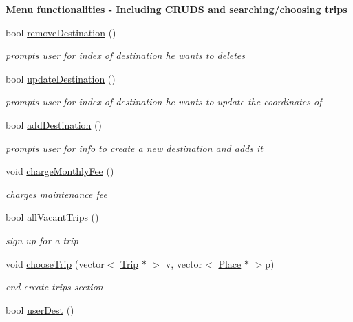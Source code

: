 \begin{Indent}{\bf Menu functionalities -\/ Including C\+R\+U\+D\+S and searching/choosing trips}\par
\begin{DoxyCompactItemize}
\item 
bool \hyperlink{class_lyfter_a229f84ba040c5f42d9e00d1f50fbb079}{remove\+Destination} ()
\begin{DoxyCompactList}\small\item\em prompts user for index of destination he wants to deletes \end{DoxyCompactList}\item 
bool \hyperlink{class_lyfter_a3e284ab6e91636535556871e32e64b39}{update\+Destination} ()
\begin{DoxyCompactList}\small\item\em prompts user for index of destination he wants to update the coordinates of \end{DoxyCompactList}\item 
bool \hyperlink{class_lyfter_a1824e5cd2a1fd794e9686f436bb71aca}{add\+Destination} ()
\begin{DoxyCompactList}\small\item\em prompts user for info to create a new destination and adds it \end{DoxyCompactList}\item 
void \hyperlink{class_lyfter_adbcaa02b69b1649d845f93c7915a21c4}{charge\+Monthly\+Fee} ()
\begin{DoxyCompactList}\small\item\em charges maintenance fee \end{DoxyCompactList}\item 
bool \hyperlink{class_lyfter_a4497de43f6d28891c8588d6906a689a3}{all\+Vacant\+Trips} ()
\begin{DoxyCompactList}\small\item\em sign up for a trip \end{DoxyCompactList}\item 
void \hyperlink{class_lyfter_a9d5db3a3374d3335f52af762bbcdeb55}{choose\+Trip} (vector$<$ \hyperlink{class_trip}{Trip} $\ast$ $>$ v, vector$<$ \hyperlink{class_place}{Place} $\ast$ $>$p)
\begin{DoxyCompactList}\small\item\em end create trips section \end{DoxyCompactList}\item 
bool \hyperlink{class_lyfter_a95f36b59a7d75af33274a0caf2d68901}{user\+Dest} ()

\end{DoxyCompactItemize}
\end{Indent}
